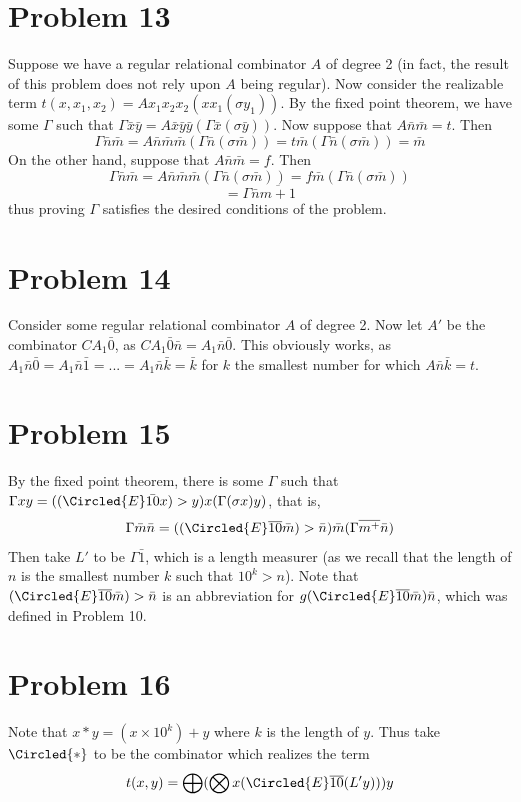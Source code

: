 \documentclass{article}
\theoremstyle{definition}
\begin{document}
\section*{Problem 13}
Suppose we have a regular relational combinator $A$ of degree 2 (in fact, the result of this problem does not rely upon $A$ being regular). 
Now consider the realizable term $t(x,x_1,x_2)=Ax_1x_2x_2(xx_1(\sigma y_1))$. By the fixed point theorem, we have some $\Gamma$ such that 
$\Gamma \bar{x}\bar{y}=A\bar{x}\bar{y}\bar{y}(\Gamma\bar{x}(\sigma\bar{y}))$. Now suppose that $A\bar{n}\bar{m}=t$. Then 
\[ \Gamma\bar{n}\bar{m}=A\bar{n}\bar{m}\bar{m}(\Gamma\bar{n}(\sigma\bar{m}))=t\bar{m}(\Gamma\bar{n}(\sigma\bar{m}))=\bar{m} \] On the other hand, suppose that 
$A\bar{n}\bar{m}=f$. Then
\[ \Gamma\bar{n}\bar{m}=A\bar{n}\bar{m}\bar{m}(\Gamma\bar{n}(\sigma\bar{m}))=f\bar{m}(\Gamma\bar{n}(\sigma\bar{m})) \]
\[ =\Gamma\bar{n}\overline{m+1} \] 
thus proving $\Gamma$ satisfies the desired conditions of the problem.

\section*{Problem 14}
Consider some regular relational combinator $A$ of degree 2. Now let $A'$ be the combinator $CA_1\bar{0}$, as $CA_1\bar{0}\bar{n}=A_1\bar{n}\bar{0}$. This obviously works, as
$A_1\bar{n}\bar{0}=A_1\bar{n}\bar{1}=...=A_1\bar{n}\bar{k}=\bar{k}$ for $k$ the smallest number for which $A\bar{n}\bar{k}=t$. 

\section*{Problem 15}
By the fixed point theorem, there is some $\Gamma$ such that $\Gamma xy=((\Circled{E}\bar{10}x)>y)x(\Gamma (\sigma x)y)$, that is, 
\[ \Gamma\bar{m}\bar{n}=((\Circled{E}\overline{10}\bar{m})>\bar{n})\bar{m}(\Gamma\overline{m^+}\bar{n}) \] 
Then take $L'$ to be $\Gamma\bar{1}$, which is a length measurer (as we recall that the length of $n$ is the smallest number $k$ 
such that $10^k>n$). Note that $(\Circled{E}\overline{10}\bar{m})>\bar{n}$ is an abbreviation for 
$g(\Circled{E}\overline{10}\bar{m})\bar{n}$, which was defined in Problem 10.

\section*{Problem 16}
Note that $x*y=(x\times 10^k)+y$ where $k$ is the length of $y$. Thus take $\Circled{*}$ to be the combinator which realizes the term
\[ t(x,y)=\bigoplus(\bigotimes x(\Circled{E}\overline{10}(L'y)))y \]
\end{document}
